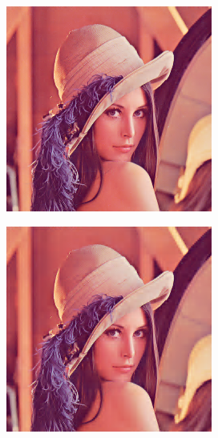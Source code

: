\documentclass[11pt]{report}
\theoremstyle{plain}
\theoremstyle{remark}
\begin{document}
\begin{figure}
	\centering	
	\begin{subfigure}[b]{0.24\textwidth}
		\centering
		\includegraphics[width=\textwidth]{plaatjes/Lenna_db2_0_2.png}
	\end{subfigure}
	\begin{subfigure}[b]{0.24\textwidth}
		\centering
		\includegraphics[width=\textwidth]{plaatjes/Lenna_db2_0_1.png}

\end{subfigure}
\end{figure}
\end{document}
